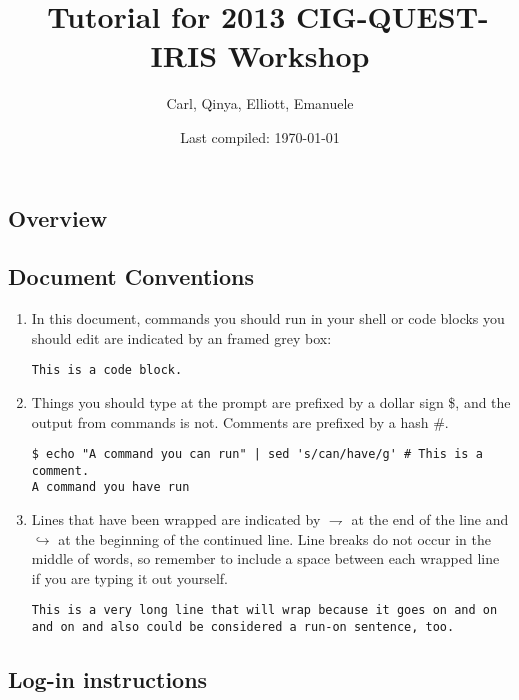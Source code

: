 \documentclass[10pt,fleqn,letterpaper]{article}
\title{\specfem\ Tutorial for 2013 CIG-QUEST-IRIS Workshop}
\author{Carl, Qinya, Elliott, Emanuele}
\date{Last compiled: \today}
\begin{document}

\maketitle



\subsection*{Overview}


\subsection*{Document Conventions}

\begin{enumerate}
\item In this document, commands you should run in your shell or code blocks
      you should edit are indicated by an framed grey box:
\begin{lstlisting}
This is a code block.
\end{lstlisting}

\item Things you should type at the prompt are prefixed by a dollar sign \$,
      and the output from commands is not. Comments are prefixed by a hash \#.
\begin{lstlisting}
$ echo "A command you can run" | sed 's/can/have/g' # This is a comment.
A command you have run
\end{lstlisting}

\item Lines that have been wrapped are indicated by $\rightharpoondown$ at the
      end of the line and $\hookrightarrow$ at the beginning of the continued
      line. Line breaks do not occur in the middle of words, so remember to
      include a space between each wrapped line if you are typing it out yourself.
\begin{lstlisting}
This is a very long line that will wrap because it goes on and on and on and also could be considered a run-on sentence, too.
\end{lstlisting}
\end{enumerate}


\subsection*{Log-in instructions}
\end{document}
